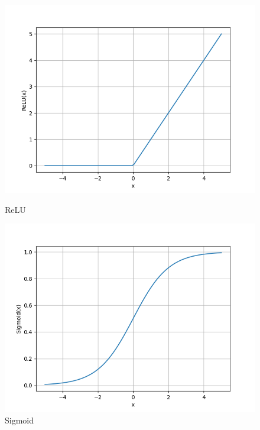 \begin{figure}[ht]
    \centering
    \begin{minipage}[t]{0.3\linewidth}
        \includegraphics[width=\linewidth]{Rozdziały/02.Podstawy_teoretyczne/relu.png}
        \caption{ReLU}
        \label{fig:image14}
    \end{minipage}
    \hspace{0.5cm}
    \begin{minipage}[t]{0.3\linewidth}
        \includegraphics[width=\linewidth]{Rozdziały/02.Podstawy_teoretyczne/sigmoid.png}
        \caption{Sigmoid}
        \label{fig:image15}
    \end{minipage}
    \hspace{0.5cm}

\end{figure}
